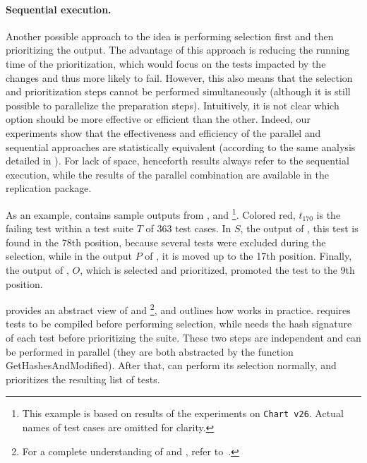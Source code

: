 \paragraph{Sequential execution.}
Another possible approach to the idea is performing selection first and then prioritizing the output.
The advantage of this approach is reducing the running time of the prioritization, which would focus on the tests impacted by the changes and thus more likely to fail.
However, this also means that the selection and prioritization steps cannot be performed simultaneously (although it is still possible to parallelize the preparation steps).
Intuitively, it is not clear which option should be more effective or efficient than the other.
Indeed, our experiments show that the effectiveness and efficiency of the parallel and sequential approaches are statistically equivalent (according to the same analysis detailed in ).
For lack of space, henceforth \fz results always refer to the sequential execution, while the results of the parallel combination are available in the replication package.

As an example,  contains sample outputs from \ek, \fs and \fz\footnote{This example is based on results of the experiments on \texttt{Chart v26}. Actual names of test cases are omitted for clarity.}.
Colored red, $t_{170}$ is the failing test within a test suite $T$ of 363 test cases.
In $S$, the output of \ek, this test is found in the 78th position, because several tests were excluded during the selection, while in the output $P$ of \fs, it is moved up to the 17th position.
Finally, the output of \fz, $O$, which is selected and prioritized, promoted the test to the 9th position.

 provides an abstract view of \ek and \fs\footnote{For a complete understanding of \ek and \fs, refer to~\cite{gligoricEk,miranda_fast_2018}.}, and outlines how \fz works in practice.
\ek requires tests to be compiled before performing selection, while \fs needs the hash signature of each test before prioritizing the suite.
These two steps are independent and can be performed in parallel (they are both abstracted by the function GetHashesAndModified).
After that, \ek can perform its selection normally, and \fs prioritizes the resulting list of tests.




